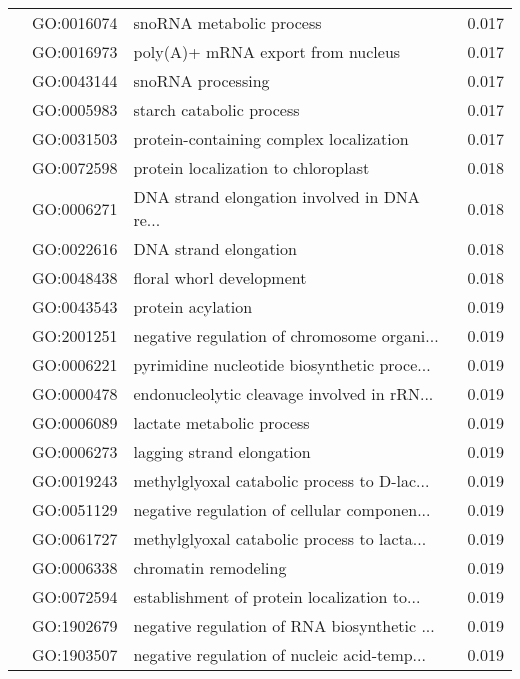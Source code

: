 \begin{longtable}{lllr}
   & GO:0016074 &                     snoRNA metabolic process &         0.017 \\
   & GO:0016973 &            poly(A)+ mRNA export from nucleus &         0.017 \\
   & GO:0043144 &                            snoRNA processing &         0.017 \\
   & GO:0005983 &                     starch catabolic process &         0.017 \\
   & GO:0031503 &      protein-containing complex localization &         0.017 \\
   & GO:0072598 &          protein localization to chloroplast &         0.018 \\
   & GO:0006271 &  DNA strand elongation involved in DNA re... &         0.018 \\
   & GO:0022616 &                        DNA strand elongation &         0.018 \\
   & GO:0048438 &                     floral whorl development &         0.018 \\
   & GO:0043543 &                            protein acylation &         0.019 \\
   & GO:2001251 &  negative regulation of chromosome organi... &         0.019 \\
   & GO:0006221 &  pyrimidine nucleotide biosynthetic proce... &         0.019 \\
   & GO:0000478 &  endonucleolytic cleavage involved in rRN... &         0.019 \\
   & GO:0006089 &                    lactate metabolic process &         0.019 \\
   & GO:0006273 &                    lagging strand elongation &         0.019 \\
   & GO:0019243 &  methylglyoxal catabolic process to D-lac... &         0.019 \\
   & GO:0051129 &  negative regulation of cellular componen... &         0.019 \\
   & GO:0061727 &  methylglyoxal catabolic process to lacta... &         0.019 \\
   & GO:0006338 &                         chromatin remodeling &         0.019 \\
   & GO:0072594 &  establishment of protein localization to... &         0.019 \\
   & GO:1902679 &  negative regulation of RNA biosynthetic ... &         0.019 \\
   & GO:1903507 &  negative regulation of nucleic acid-temp... &         0.019 \\

\end{longtable}
